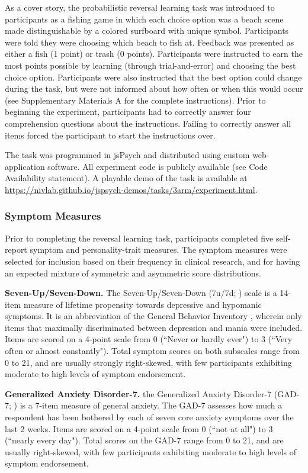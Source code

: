 \documentclass[a4paper,notitlepage,12pt]{article}
\begin{document}
As a cover story, the probabilistic reversal learning task was introduced to participants as a fishing game in which each choice option was a beach scene made distinguishable by a colored surfboard with unique symbol. Participants were told they were choosing which beach to fish at. Feedback was presented as either a fish (1 point) or trash (0 points). Participants were instructed to earn the most points possible by learning (through trial-and-error) and choosing the best choice option. Participants were also instructed that the best option could change during the task, but were not informed about how often or when this would occur (see Supplementary Materials A for the complete instructions). Prior to beginning the experiment, participants had to correctly answer four comprehension questions about the instructions. Failing to correctly answer all items forced the participant to start the instructions over.

The task was programmed in jsPsych \cite{deleeuw_2015_jspsych} and distributed using custom web-application software. All experiment code is publicly available (see Code Availability statement). A playable demo of the task is available at \url{https://nivlab.github.io/jspsych-demos/tasks/3arm/experiment.html}.

\subsubsection*{Symptom Measures}

Prior to completing the reversal learning task, participants completed five self-report symptom and personality-trait measures. The symptom measures were selected for inclusion based on their frequency in clinical research, and for having an expected mixture of symmetric and asymmetric score distributions. 

\textbf{Seven-Up/Seven-Down.} The Seven-Up/Seven-Down (7u/7d; \cite{youngstrom_2013_susd}) scale is a 14-item measure of lifetime propensity towards depressive and hypomanic symptoms. It is an abbreviation of the General Behavior Inventory \cite{depue1981behavioral}, wherein only items that maximally discriminated between depression and mania were included. Items are scored on a 4-point scale from 0 (``Never or hardly ever") to 3 (``Very often or almost constantly"). Total symptom scores on both subscales range from 0 to 21, and are usually strongly right-skewed, with few participants exhibiting moderate to high levels of symptom endorsement. 

\textbf{Generalized Anxiety Disorder-7.} the Generalized Anxiety Disorder-7 (GAD-7; \cite{spitzer2006brief}) is a 7-item measure of general anxiety. The GAD-7 assesses how much a respondent has been bothered by each of seven core anxiety symptoms over the last 2 weeks. Items are scored on a 4-point scale from 0 (``not at all") to 3 (``nearly every day"). Total scores on the GAD-7 range from 0 to 21, and are usually right-skewed, with few participants exhibiting moderate to high levels of symptom endorsement.
\end{document}
